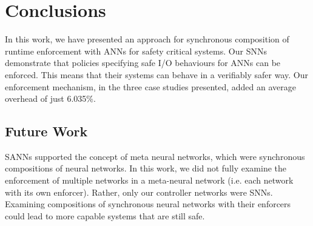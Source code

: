 \section{Conclusions}

In this work, we have presented an approach for synchronous composition of runtime enforcement with \acfp{ANN} for safety critical systems.
Our \acfp{SNN} demonstrate that policies specifying safe I/O behaviours for \acp{ANN} can be enforced.
This means that their systems can behave in a verifiably safer way.
Our enforcement mechanism, in the three case studies presented, added an average overhead of just 6.035\%.

\subsection{Future Work}

\acp{SANN} supported the concept of meta neural networks, which were synchronous compositions of neural networks. 
In this work, we did not fully examine the enforcement of multiple networks in a meta-neural network (i.e. each network with its own enforcer).
Rather, only our controller networks were \acp{SNN}.
Examining compositions of synchronous neural networks with their enforcers could lead to more capable systems that are still safe. 

\label{sec:conclusion}


